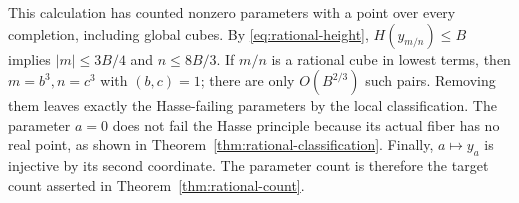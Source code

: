 This calculation has counted nonzero parameters with a point over every
completion, including global cubes.  By \eqref{eq:rational-height},
\(H(y_{m/n})\le B\) implies \(|m|\le3B/4\) and \(n\le8B/3\).
If \(m/n\) is a rational cube in lowest terms, then
\(m=b^3,n=c^3\) with \((b,c)=1\); there are only \(O(B^{2/3})\)
such pairs.  Removing them leaves exactly the Hasse-failing parameters by
the local classification.  The parameter \(a=0\) does not fail the
Hasse principle because its actual fiber has no real point, as shown in
Theorem~\ref{thm:rational-classification}.  Finally, \(a\mapsto y_a\) is
injective by its second coordinate.  The parameter count is therefore
the target count asserted in Theorem~\ref{thm:rational-count}.
